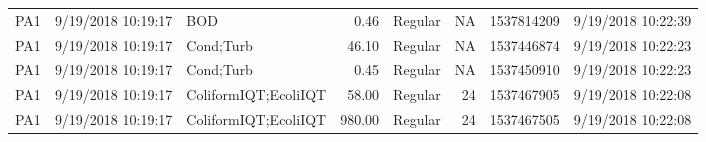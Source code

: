\documentclass[
  letterpaper,
  DIV=11,
  numbers=noendperiod]{scrartcl}
\begin{document}
\begin{longtable*}{lrlrlrrr}
PA1 & 9/19/2018 10:19:17 & BOD & 0.46 & Regular & NA & 1537814209 & 9/19/2018 10:22:39 \\ 
PA1 & 9/19/2018 10:19:17 & Cond;Turb & 46.10 & Regular & NA & 1537446874 & 9/19/2018 10:22:23 \\ 
PA1 & 9/19/2018 10:19:17 & Cond;Turb & 0.45 & Regular & NA & 1537450910 & 9/19/2018 10:22:23 \\ 
PA1 & 9/19/2018 10:19:17 & ColiformIQT;EcoliIQT & 58.00 & Regular & 24 & 1537467905 & 9/19/2018 10:22:08 \\ 
PA1 & 9/19/2018 10:19:17 & ColiformIQT;EcoliIQT & 980.00 & Regular & 24 & 1537467505 & 9/19/2018 10:22:08 \\ 
\bottomrule
\end{longtable*}
\end{document}
